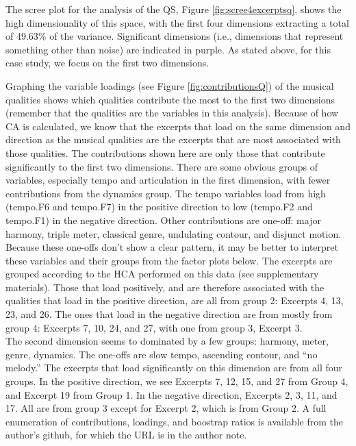 \documentclass[
  english,
  man,floatsintext]{apa6}
\begin{document}
The scree plot for the analysis of the QS, Figure \ref{fig:scree4excerptsq}, shows the high dimensionality of this space, with the first four dimensions extracting a total of 49.63\% of the variance. Significant dimensions (i.e., dimensions that represent something other than noise) are indicated in purple. As stated above, for this case study, we focus on the first two dimensions.

Graphing the variable loadings (see Figure \ref{fig:contributionsQ}) of the musical qualities shows which qualities contribute the most to the first two dimensions (remember that the qualities are the variables in this analysis). Because of how CA is calculated, we know that the excerpts that load on the same dimension and direction as the musical qualities are the excerpts that are most associated with those qualities. The contributions shown here are only those that contribute significantly to the first two dimensions.
There are some obvious groups of variables, especially tempo and articulation in the first dimension, with fewer contributions from the dynamics group. The tempo variables load from high (tempo.F6 and tempo.F7) in the positive direction to low (tempo.F2 and tempo.F1) in the negative direction. Other contributions are one-off: major harmony, triple meter, classical genre, undulating contour, and disjunct motion. Because these one-offs don't show a clear pattern, it may be better to interpret these variables and their groups from the factor plots below. The excerpts are grouped according to the HCA performed on this data (see supplementary materials). Those that load positively, and are therefore associated with the qualities that load in the positive direction, are all from group 2: Excerpts 4, 13, 23, and 26. The ones that load in the negative direction are from mostly from group 4: Excerpts 7, 10, 24, and 27, with one from group 3, Excerpt 3.\\
The second dimension seems to dominated by a few groups: harmony, meter, genre, dynamics. The one-offs are slow tempo, ascending contour, and ``no melody.'' The excerpts that load significantly on this dimension are from all four groups. In the positive direction, we see Excerpts 7, 12, 15, and 27 from Group 4, and Excerpt 19 from Group 1. In the negative direction, Excerpts 2, 3, 11, and 17. All are from group 3 except for Excerpt 2, which is from Group 2. A full enumeration of contributions, loadings, and boostrap ratios is available from the author's github, for which the URL is in the author note.
\end{document}
